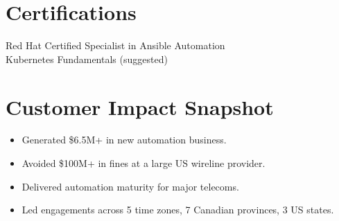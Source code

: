 \documentclass[11pt]{article}
\begin{document}
\section*{Certifications}
Red Hat Certified Specialist in Ansible Automation \\
Kubernetes Fundamentals (suggested) \\
[List others if held, e.g., AWS, CKA]

\section*{Customer Impact Snapshot}
\begin{itemize}[leftmargin=*]
    \item Generated \$6.5M+ in new automation business.
    \item Avoided \$100M+ in fines at a large US wireline provider.
    \item Delivered automation maturity for major telecoms.
    \item Led engagements across 5 time zones, 7 Canadian provinces, 3 US states.
\end{itemize}
\end{document}
